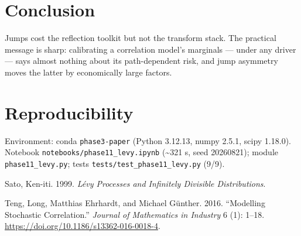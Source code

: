 \documentclass[
  english,
  10pt,
  letterpaper,
  DIV=11,
  numbers=noendperiod]{scrartcl}
\newlength{\cslhangindent}
\newenvironment{CSLReferences}[2] %
 {\begin{list}{}{%
  \setlength{\itemindent}{0pt}
  \setlength{\leftmargin}{0pt}
  \setlength{\parsep}{0pt}
  \ifodd #1
   \setlength{\leftmargin}{\cslhangindent}
   \setlength{\itemindent}{-1\cslhangindent}
  \fi
  \setlength{\itemsep}{#2\baselineskip}}}
 {\end{list}}
\begin{document}
\section{Conclusion}\label{sec-conclusion}

Jumps cost the reflection toolkit but not the transform stack. The
practical message is sharp: calibrating a correlation model's marginals
--- under any driver --- says almost nothing about its path-dependent
risk, and jump asymmetry moves the latter by economically large factors.

\section{Reproducibility}\label{sec-repro}

Environment: conda \texttt{phase3-paper} (Python 3.12.13, numpy 2.5.1,
scipy 1.18.0). Notebook \texttt{notebooks/phase11\_levy.ipynb}
(\textasciitilde321 s, seed 20260821); module \texttt{phase11\_levy.py};
tests \texttt{tests/test\_phase11\_levy.py} (9/9).

\protect{}\label{refs}
\begin{CSLReferences}{1}{1}
Sato, Ken-iti. 1999. \emph{L{é}vy Processes and Infinitely Divisible
Distributions}.

Teng, Long, Matthias Ehrhardt, and Michael Günther. 2016. {``Modelling
Stochastic Correlation.''} \emph{Journal of Mathematics in Industry} 6
(1): 1--18. \url{https://doi.org/10.1186/s13362-016-0018-4}.

\end{CSLReferences}
\end{document}
